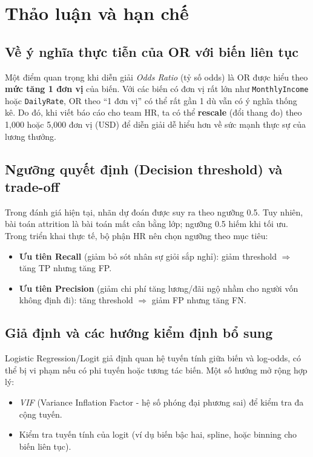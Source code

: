 \chapter{Thảo luận và hạn chế}

\section{Về ý nghĩa thực tiễn của OR với biến liên tục}
Một điểm quan trọng khi diễn giải \textit{Odds Ratio} (tỷ số odds) là OR được hiểu theo \textbf{mức tăng 1 đơn vị} của biến.
Với các biến có đơn vị rất lớn như \texttt{MonthlyIncome} hoặc \texttt{DailyRate}, OR theo ``1 đơn vị'' có thể rất gần 1 dù vẫn có ý nghĩa thống kê.
Do đó, khi viết báo cáo cho team HR, ta có thể \textbf{rescale} (đổi thang đo) theo 1{,}000 hoặc 5{,}000 đơn vị (USD) để diễn giải dễ hiểu hơn về sức mạnh thực sự của lương thưởng.

\section{Ngưỡng quyết định (Decision threshold) và trade-off}
Trong đánh giá hiện tại, nhãn dự đoán được suy ra theo ngưỡng 0.5. 
Tuy nhiên, bài toán attrition là bài toán mất cân bằng lớp; ngưỡng 0.5 hiếm khi tối ưu. 
Trong triển khai thực tế, bộ phận HR nên chọn ngưỡng theo mục tiêu:
\begin{itemize}
  \item \textbf{Ưu tiên Recall} (giảm bỏ sót nhân sự giỏi sắp nghỉ): giảm threshold \(\Rightarrow\) tăng TP nhưng tăng FP.
  \item \textbf{Ưu tiên Precision} (giảm chi phí tăng lương/đãi ngộ nhầm cho người vốn không định đi): tăng threshold \(\Rightarrow\) giảm FP nhưng tăng FN.
\end{itemize}

\section{Giả định và các hướng kiểm định bổ sung}
Logistic Regression/Logit giả định quan hệ tuyến tính giữa biến và log-odds, có thể bị vi phạm nếu có phi tuyến hoặc tương tác biến.
Một số hướng mở rộng hợp lý:
\begin{itemize}
  \item \textit{VIF} (Variance Inflation Factor - hệ số phóng đại phương sai) để kiểm tra đa cộng tuyến.
  \item Kiểm tra tuyến tính của logit (ví dụ biến bậc hai, spline, hoặc binning cho biến liên tục).
\end{itemize}

